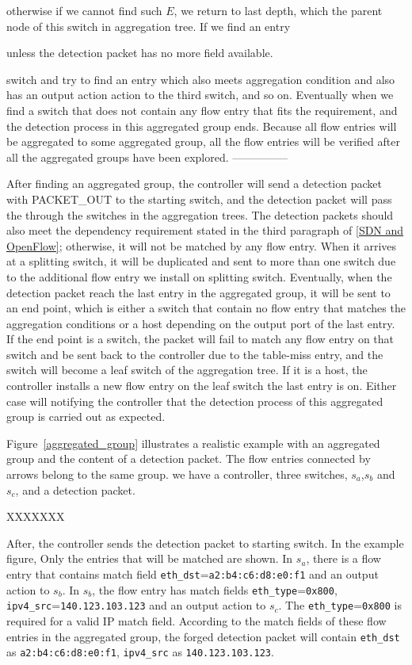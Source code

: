 otherwise if we cannot find such $E$, we return to last depth, which the parent node of this switch in aggregation tree. If we find an entry 

unless the detection packet has no more field available. 



switch and try to find an entry which also meets aggregation condition and also has an output action action to the third switch, and so on. Eventually when we find a switch that does not contain any flow entry that fits the requirement, and the detection process in this aggregated group ends. Because all flow entries will be aggregated to some aggregated group, all the flow entries will be verified after all the aggregated groups have been explored.
---------------




After finding an aggregated group, the controller will send a detection packet with PACKET\_OUT to the starting switch, and the detection packet will pass the through the switches in the aggregation trees. The detection packets should also meet the dependency requirement stated in the third paragraph of \ref{SDN and OpenFlow}; otherwise, it will not be matched by any flow entry. When it arrives at a splitting switch, it will be duplicated and sent to more than one switch due to the additional flow entry we install on splitting switch. Eventually, when the detection packet reach the last entry in the aggregated group, it will be sent to an end point, which is either a switch that contain no flow entry that matches the aggregation conditions or a host depending on the output port of the last entry. If the end point is a switch, the packet will fail to match any flow entry on that switch and be sent back to the controller due to the table-miss entry, and the switch will become a leaf switch of the aggregation tree. If it is a host, the controller installs a new flow entry on the leaf switch the last entry is on. Either case will notifying the controller that the detection process of this aggregated group is carried out as expected.

Figure~\ref{aggregated_group} illustrates a realistic example with an aggregated group and the content of a detection packet. The flow entries connected by arrows belong to the same group. we have a controller, three switches, $s_a$,$s_b$ and $s_c$, and a detection packet.

XXXXXXX


After, the controller sends the detection packet to starting switch. In the example figure,  Only the entries that will be matched are shown. In $s_a$, there is a flow entry that contains match field \texttt{eth\_dst}=\texttt{a2:b4:c6:d8:e0:f1} and an output action to $s_b$. In $s_b$, the flow entry has match fields \texttt{eth\_type}=\texttt{0x800}, \texttt{ipv4\_src}=\texttt{140.123.103.123} and an output action to $s_c$. The \texttt{eth\_type}=\texttt{0x800} is required for a valid IP match field. According to the match fields of these flow entries in the aggregated group, the forged detection packet will contain \texttt{eth\_dst} as \texttt{a2:b4:c6:d8:e0:f1}, \texttt{ipv4\_src} as \texttt{140.123.103.123}.  

